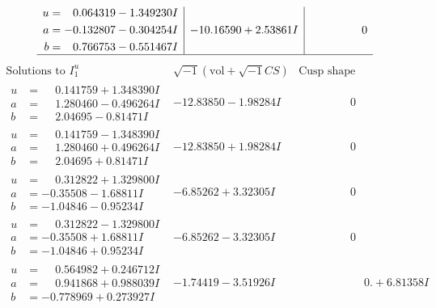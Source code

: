 \documentclass[1p]{elsarticle_modified}
\theoremstyle{definition}
\newcommand{\I}{\sqrt{-1}}
\begin{document}
$$\begin{array}{c|c|c}
\begin{aligned}
u &= \phantom{-}0.064319 - 1.349230 I \\
a &= -0.132807 - 0.304254 I \\
b &= \phantom{-}0.766753 - 0.551467 I\end{aligned}
 & -10.16590 + 2.53861 I & \phantom{-0.000000 } 0\\
 \hline 
 \end{array}$$\newpage$$\begin{array}{c|c|c}  
\text{Solutions to }I^u_{1}& \I (\text{vol} + \sqrt{-1}CS) & \text{Cusp shape}\\
 \hline 
\begin{aligned}
u &= \phantom{-}0.141759 + 1.348390 I \\
a &= \phantom{-}1.280460 - 0.496264 I \\
b &= \phantom{-}2.04695 - 0.81471 I\end{aligned}
 & -12.83850 - 1.98284 I & \phantom{-0.000000 } 0 \\ \hline\begin{aligned}
u &= \phantom{-}0.141759 - 1.348390 I \\
a &= \phantom{-}1.280460 + 0.496264 I \\
b &= \phantom{-}2.04695 + 0.81471 I\end{aligned}
 & -12.83850 + 1.98284 I & \phantom{-0.000000 } 0 \\ \hline\begin{aligned}
u &= \phantom{-}0.312822 + 1.329800 I \\
a &= -0.35508 - 1.68811 I \\
b &= -1.04846 - 0.95234 I\end{aligned}
 & -6.85262 + 3.32305 I & \phantom{-0.000000 } 0 \\ \hline\begin{aligned}
u &= \phantom{-}0.312822 - 1.329800 I \\
a &= -0.35508 + 1.68811 I \\
b &= -1.04846 + 0.95234 I\end{aligned}
 & -6.85262 - 3.32305 I & \phantom{-0.000000 } 0 \\ \hline\begin{aligned}
u &= \phantom{-}0.564982 + 0.246712 I \\
a &= \phantom{-}0.941868 + 0.988039 I \\
b &= -0.778969 + 0.273927 I\end{aligned}
 & -1.74419 - 3.51926 I & \phantom{-0.000000 -}0. + 6.81358 I \\ \hline\begin{aligned}

\end{aligned}
\end{array}$$
\end{document}
